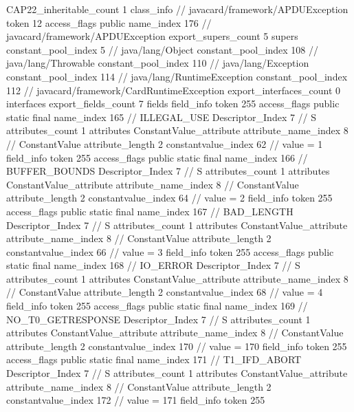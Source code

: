 {{{			CAP22_inheritable_count	1
		}
		class_info {		// javacard/framework/APDUException
			token	12
			access_flags	public
			name_index	176		// javacard/framework/APDUException
			export_supers_count	5
			supers {
				constant_pool_index	5		// java/lang/Object
				constant_pool_index	108		// java/lang/Throwable
				constant_pool_index	110		// java/lang/Exception
				constant_pool_index	114		// java/lang/RuntimeException
				constant_pool_index	112		// javacard/framework/CardRuntimeException
			}
			export_interfaces_count	0
			interfaces {
			}
			export_fields_count	7
			fields {
			field_info {
				token	255
				access_flags	public static final
				name_index	165		// ILLEGAL_USE
				Descriptor_Index	7		// S
				attributes_count	1
				attributes {
				ConstantValue_attribute {
					attribute_name_index	8		// ConstantValue
					attribute_length	2
					constantvalue_index	62		// value = 1
				}
				}
			}
			field_info {
				token	255
				access_flags	public static final
				name_index	166		// BUFFER_BOUNDS
				Descriptor_Index	7		// S
				attributes_count	1
				attributes {
				ConstantValue_attribute {
					attribute_name_index	8		// ConstantValue
					attribute_length	2
					constantvalue_index	64		// value = 2
				}
				}
			}
			field_info {
				token	255
				access_flags	public static final
				name_index	167		// BAD_LENGTH
				Descriptor_Index	7		// S
				attributes_count	1
				attributes {
				ConstantValue_attribute {
					attribute_name_index	8		// ConstantValue
					attribute_length	2
					constantvalue_index	66		// value = 3
				}
				}
			}
			field_info {
				token	255
				access_flags	public static final
				name_index	168		// IO_ERROR
				Descriptor_Index	7		// S
				attributes_count	1
				attributes {
				ConstantValue_attribute {
					attribute_name_index	8		// ConstantValue
					attribute_length	2
					constantvalue_index	68		// value = 4
				}
				}
			}
			field_info {
				token	255
				access_flags	public static final
				name_index	169		// NO_T0_GETRESPONSE
				Descriptor_Index	7		// S
				attributes_count	1
				attributes {
				ConstantValue_attribute {
					attribute_name_index	8		// ConstantValue
					attribute_length	2
					constantvalue_index	170		// value = 170
				}
				}
			}
			field_info {
				token	255
				access_flags	public static final
				name_index	171		// T1_IFD_ABORT
				Descriptor_Index	7		// S
				attributes_count	1
				attributes {
				ConstantValue_attribute {
					attribute_name_index	8		// ConstantValue
					attribute_length	2
					constantvalue_index	172		// value = 171
				}
				}
			}
			field_info {
				token	255
}}}}}
